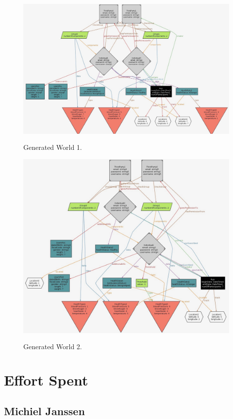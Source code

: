 \documentclass[12pt]{article}
\begin{document}
\begin{figure}[H]
\centering
\includegraphics[scale=0.38, angle=-90, origin=c]{world1.jpeg}
\label{fig:world1}
\caption{Generated World 1.}
\end{figure}

\begin{figure}[H]
\centering
\includegraphics[scale=0.41, angle=-90, origin=c]{world2.jpeg}
\label{fig:world2}
\caption{Generated World 2.}
\end{figure}

\newpage
\section{Effort Spent}
\subsection{Michiel Janssen}
\end{document}
